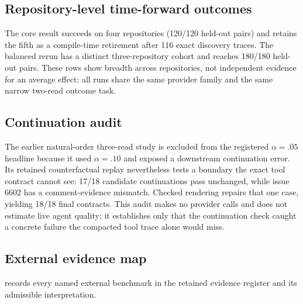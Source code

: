\subsection{Repository-level time-forward outcomes}

\begin{table}[t]
  \centering
  \caption{Disaggregated cross-repository time-forward outcomes behind
  \cref{sec:res-multirepo}.
  The core protocol uses four completed repositories and one compile-time
  retirement; the balanced rerun changes the selected repositories and class
  mix, so it is reported separately rather than pooled with the core protocol.
  Reductions compare the compiled condition with the paired unchanged baseline.}
  \label{tab:multirepo-disaggregated}
  \footnotesize
  \setlength{\tabcolsep}{3.5pt}
  
\end{table}

The core result succeeds on four repositories (120/120 held-out pairs) and
retains the fifth as a compile-time retirement after 116 exact discovery traces.
The balanced rerun has a distinct three-repository cohort and reaches 180/180
held-out pairs. These rows show breadth across repositories, not independent
evidence for an average effect: all runs share the same provider family and
the same narrow two-read outcome task.

\subsection{Continuation audit}

The earlier natural-order three-read study is excluded from the registered
$\alpha=.05$ headline because it used $\alpha=.10$ and exposed a downstream
continuation error. Its retained counterfactual replay nevertheless tests a
boundary the exact tool contract cannot see: 17/18 candidate continuations pass
unchanged, while issue 6602 has a comment-evidence mismatch. Checked rendering
repairs that one case, yielding 18/18 final contracts. This audit makes no
provider calls and does not estimate live agent quality; it establishes only
that the continuation check caught a concrete failure the compacted tool trace
alone would miss.

\subsection{External evidence map}
\label{app:external}

 records every named external benchmark in the
retained evidence register and its admissible interpretation.

